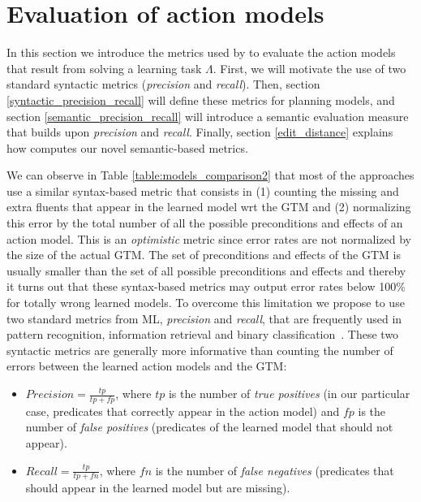 
\section{Evaluation of action models}
\label{sec:evaluation}

In this section we introduce the metrics used by \FAMA to evaluate the action models that result from solving a learning task $\Lambda$. First, we will motivate the use of two standard syntactic metrics ({\em precision} and {\em recall}). Then, section \ref{syntactic_precision_recall} will define these metrics for planning models, and section \ref{semantic_precision_recall} will introduce a semantic evaluation measure that builds upon {\em precision} and {\em recall}. Finally, section \ref{edit_distance} explains how \FAMA computes our novel semantic-based metrics.


We can observe in Table \ref{table:models_comparison2} that most of the approaches use a similar syntax-based metric that consists in (1) counting the missing and extra fluents that appear in the learned model wrt the GTM and (2) normalizing this error by the total number of all the possible preconditions and effects of an action model. This is an \emph{optimistic} metric since error rates are not normalized by the size of the actual GTM. The set of preconditions and effects of the GTM is usually smaller than the set of all possible preconditions and effects and thereby it turns out that these syntax-based metrics may output error rates below 100\% for totally wrong learned models. To overcome this limitation we propose to use two standard metrics from ML, {\em precision} and {\em recall}, that are frequently used in pattern recognition, information retrieval and binary classification~\cite{davis2006relationship}. These two syntactic metrics are generally more informative than counting the number of errors between the learned action models and the GTM:


\begin{itemize}
\item $Precision=\frac{tp}{tp+fp}$, where $tp$ is the number of {\em true positives} (in our particular case, predicates that correctly appear in the action model) and $fp$ is the number of {\em false positives} (predicates of the learned model that should not appear).
\item $Recall=\frac{tp}{tp+fn}$, where $fn$ is the number of {\em false negatives} (predicates that should appear in the learned model but are missing).
\end{itemize}


